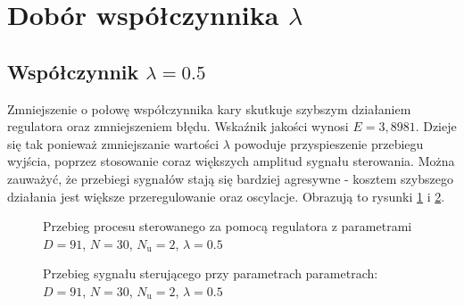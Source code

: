 \section{Dobór współczynnika $\lambda$}
\subsection{Współczynnik $\lambda = 0.5$}
Zmniejszenie o połowę współczynnika kary skutkuje szybszym działaniem regulatora oraz zmniejszeniem błędu. Wskaźnik jakości wynosi $E = 3,8981$. Dzieje się tak ponieważ zmniejszanie wartości $\lambda$ powoduje przyspieszenie przebiegu wyjścia, poprzez stosowanie coraz większych amplitud sygnału sterowania. Można zauważyć, że przebiegi sygnałów stają się bardziej agresywne - kosztem szybszego działania jest większe przeregulowanie oraz oscylacje. Obrazują to rysunki \ref{dmc_lam_0_5_y} i \ref{dmc_lam_0_5_u}.

\begin{figure}[b]
    \centering
    \caption{Przebieg procesu sterowanego za pomocą regulatora z parametrami $D = 91$, $N = 30$, $N_{\mathrm{u}} = 2$, $\lambda = 0.5$}
    \label{dmc_lam_0_5_y}
\end{figure}

\begin{figure}[b]
    \centering
    \caption{Przebieg sygnału sterującego przy parametrach parametrach: $D = 91$, $N = 30$, $N_{\mathrm{u}} = 2$, $\lambda = 0.5$}
    \label{dmc_lam_0_5_u}
\end{figure}

